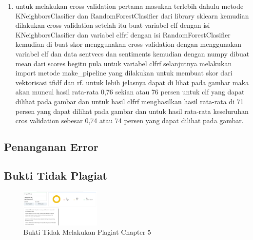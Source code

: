 \begin{enumerate}
\item untuk melakukan cross validation pertama masukan terlebih dahulu metode KNeighborsClasifier dan RandomForestClasifier dari library sklearn kemudian dilakukan cross validation setelah itu buat variabel clf dengan isi KNeighborsClasifier dan variabel clfrf dengan isi RandomForestClasifier kemudian di buat skor menggunakan cross validation dengan menggunakan variabel clf dan data sentvecs dan sentiments kemudian dengan numpy dibuat mean dari scores begitu pula untuk variabel clfrf selanjutnya melakukan import metode make\_pipeline yang dilakukan untuk membuat skor dari vektorisasi tfidf dan rf. untuk lebih jelasnya dapat di lihat pada gambar maka akan muncul hasil rata-rata 0,76 sekian atau 76 persen untuk clf yang dapat dilihat pada gambar dan untuk hasil clfrf menghasilkan hasil rata-rata di 71 persen yang dapat dilihat pada gambar dan untuk hasil rata-rata keseluruhan cros validation sebesar 0,74 atau 74 persen yang dapat dilihat pada gambar.



\end{enumerate}

\subsection{Penanganan Error}

\subsection{Bukti Tidak Plagiat}
\begin{figure}[H]
\centering
	\includegraphics[width=4cm]{figures/1174008/5/bukticekplagiat.PNG}
	\caption{Bukti Tidak Melakukan Plagiat Chapter 5}
\end{figure}

